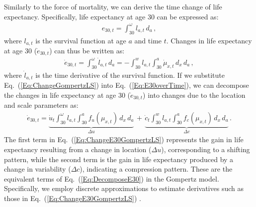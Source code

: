 \documentclass[Thesis]{subfiles}
\begin{document}
Similarly to the force of mortality, we can derive the time change of life expectancy. Specifically, life expectancy at age 30 can be expressed as:
\begin{eqnarray}\label{Eq:E30}
e_{30,t} = \int_{30}^{\omega} l_{a,t} \, d_a \, ,
\end{eqnarray}
where $l_{a,t}$ is the survival function at age $a$ and time $t$. Changes in life expectancy at age 30 ($\dot{e}_{30,t}$) can thus be written as:
\begin{eqnarray}\label{Eq:E30overTime}
\dot{e}_{30,t} = \int_{30}^{\omega} \dot{l}_{a,t} \, d_a = - \int_{30}^{w} l_{a,t} \int_{30}^{a} \dot{\mu}_{x,t} \, d_x \, d_a \, ,
\end{eqnarray}
where $\dot{l}_{a,t}$ is the time derivative of the survival function. If we substitute Eq.~(\ref{Eq:ChangeGompertzLS}) into Eq.~(\ref{Eq:E30overTime}), we can decompose the changes in life expectancy at age 30 ($\dot{e}_{30,t}$) into changes due to the location and scale parameters as:
\begin{eqnarray}\label{Eq:ChangeE30GompertzLS}
\dot{e}_{30,t} = \underbrace{\dot{u}_{t} \int_{30}^{\omega} l_{a,t} \int_{30}^{a} f_u(\mu_{x,t}) \, d_x \, d_a}_\text{$\Delta u$} \, + \, \underbrace{\dot{c}_{t} \int_{30}^{w} l_{a,t} \int_{30}^{a} f_c(\mu_{x,t}) \, d_x \, d_a}_\text{$\Delta c$} \, .
\end{eqnarray}
The first term in Eq.~(\ref{Eq:ChangeE30GompertzLS}) represents the gain in life expectancy resulting from a
change in location ($\Delta u$), corresponding to a shifting pattern, while the second
term is the gain in life expectancy produced by a change in variability ($\Delta c$),
indicating a compression pattern. These are the equivalent terms of Eq.~(\ref{Eq:DecomposeE30}) in the Gompertz model. 
Specifically, we employ discrete approximations to estimate derivatives such as those in Eq.~(\ref{Eq:ChangeE30GompertzLS}) \cite[see][Appendix B]{bergeron2015decomposing}.

\cleardoublepage
\end{document}
